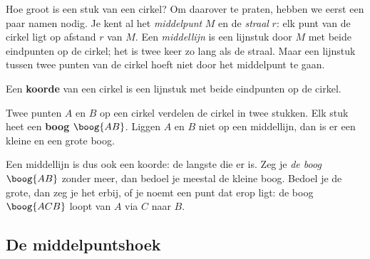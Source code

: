 Hoe groot is een stuk van een cirkel? Om daarover te praten, hebben we eerst een paar namen nodig. Je kent al het \emph{middelpunt} $M$ en de \emph{straal} $r$: elk punt van de cirkel ligt op afstand $r$ van $M$. Een \emph{middellijn} is een lijnstuk door $M$ met beide eindpunten op de cirkel; het is twee keer zo lang als de straal. Maar een lijnstuk tussen twee punten van de cirkel hoeft niet door het middelpunt te gaan.

\begin{theorie}
\begin{minipage}[t]{.64\linewidth}
\vspace{0pt}
Een \textbf{\textcolor{accent}{koorde}} van een cirkel is een lijnstuk met beide eindpunten op de cirkel.

\vspace{1mm}
Twee punten $A$ en $B$ op een cirkel verdelen de cirkel in twee stukken. Elk stuk heet een \textbf{\textcolor{accent}{boog}} $\boog{AB}$. Liggen $A$ en $B$ niet op een middellijn, dan is er een kleine en een grote boog.
\end{minipage}\hfill
\begin{minipage}[t]{.32\linewidth}
\vspace{0pt}
\centering
{}
\end{minipage}
\end{theorie}

Een middellijn is dus ook een koorde: de langste die er is. Zeg je \textit{de boog} $\boog{AB}$ zonder meer, dan bedoel je meestal de kleine boog. Bedoel je de grote, dan zeg je het erbij, of je noemt een punt dat erop ligt: de boog $\boog{ACB}$ loopt van $A$ via $C$ naar $B$.

\begin{oefeningen}
\end{oefeningen}

\subsection{De middelpuntshoek}

